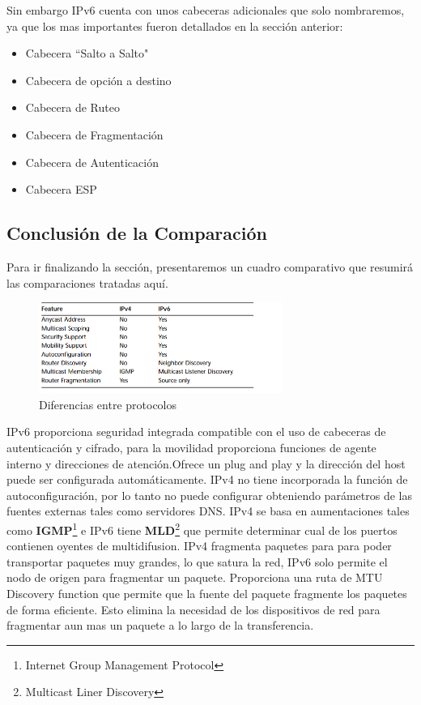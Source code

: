 \documentclass[11pt,a4paper]{article}
\begin{document}
Sin embargo IPv6 cuenta con unos cabeceras adicionales que solo nombraremos, ya que los mas 
importantes fueron detallados en la sección anterior:
\begin{itemize}
\item Cabecera ``Salto a Salto" 
\item Cabecera de opción a destino
\item  Cabecera  de Ruteo
\item Cabecera de Fragmentación
\item Cabecera de Autenticación
\item  Cabecera ESP
\end{itemize}

\subsection{Conclusión de la Comparación}
Para ir finalizando la sección, presentaremos un cuadro comparativo que resumirá las comparaciones 
tratadas aquí.

\begin{figure}[h!]
 \centering
 \includegraphics[width=0.71\textwidth]{comp.png}
 \caption[Diferencias]{Diferencias entre protocolos}
\end{figure} \par

IPv6 proporciona seguridad integrada compatible con el uso de cabeceras de autenticación y cifrado, 
para la movilidad proporciona funciones de agente interno y direcciones de atención.Ofrece un plug 
and play y la dirección del host puede ser configurada automáticamente. IPv4 no tiene incorporada la 
función de autoconfiguración, por lo tanto no puede configurar obteniendo parámetros de las fuentes 
externas tales como servidores DNS. IPv4 se basa en aumentaciones tales como 
\textbf{IGMP}\footnote{Internet Group Management Protocol} e IPv6 tiene 
\textbf{MLD}\footnote{Multicast Liner Discovery} que permite determinar cual de los puertos 
contienen oyentes de multidifusion.
IPv4 fragmenta paquetes para para poder transportar paquetes muy grandes, lo que satura la red, 
IPv6 solo permite el nodo de origen para fragmentar un paquete. Proporciona una ruta de MTU 
Discovery function que permite que la fuente del paquete fragmente los paquetes de forma eficiente. 
Esto elimina la necesidad de los dispositivos de red para fragmentar aun mas un paquete a lo largo 
de la transferencia.
\end{document}
